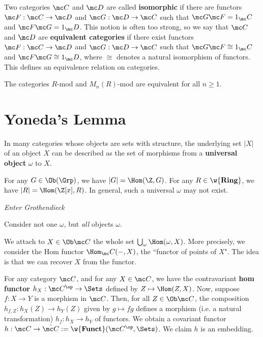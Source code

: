 \begin{defn}
    Two categories $\mc C$ and $\mc D$ are called \textbf{isomorphic} if there are functors $\mc F : \mc C \to \mc D$ and $\mc G: \mc D \to \mc C$ such that $\mc G\mc F=1_\mc C$ and $\mc F \mc G = 1 _\mc D$. This notion is often too strong, so we say that $\mc C$ and $\mc D$ are \textbf{equivalent categories} if there exist functors $\mc F : \mc C \to \mc D$ and $\mc G : \mc D \to \mc C$ such that $\mc G\mc F \cong 1_\mc C$ and $\mc F \mc G \cong 1_\mc D$, where $\cong$ denotes a natural isomorphism of functors. This defines an equivalence relation on categories.
\end{defn}

\begin{ex}
    The categories $R$-mod and $M_n(R)$-mod are equivalent for all $n \geq 1$.
\end{ex}

\section{Yoneda's Lemma}

In many categories whose objects are sets with structure, the underlying set $|X|$ of an object $X$ can be described as the set of morphisms from a \textbf{universal object} $\omega$ to $X$.

\begin{ex}
    For any $G \in \Ob (\Grp)$, we have $|G| = \Hom (\Z, G)$. For any $R \in \w{\textbf{Ring}}$, we have $|R| = \Hom (\Z[x],R)$. In general, such a universal $\omega$ may not exist.
\end{ex}

\textit{Enter Grothendieck}

\begin{rmk}
    Consider not one $\omega$, but \textit{all} objects $\omega$.

    We attach to $X \in \Ob \mc C$ the whole set $\bigcup _\omega \Hom(\omega ,X)$. More precisely, we consider the Hom functor $\Hom_\mc C(-,X)$, the ``functor of points of $X$". The idea is that we can recover $X$ from the functor.
\end{rmk}

For any category $\mc C$, and for any $X \in \mc C$, we have the contravariant \textbf{hom functor} $h_X:\mc C^{\op} \to \Sets$ defined by $Z \mapsto \Hom(Z,X)$. Now, suppose $f:X \to Y$ is a morphism in $\mc C$. Then, for all $Z \in \Ob \mc C$, the composition $h_{f,Z}:h_X(Z) \to h_Y(Z)$ given by $g \mapsto fg$ defines a morphism (i.e. a natural transformation) $h_f:h_X \to h_Y$ of functors. We obtain a covariant functor $h:\mc C \to \hat{\mc C}:= \w{\textbf{Funct}}(\mc C^{\op}, \Sets)$. We claim $h$ is an embedding.

